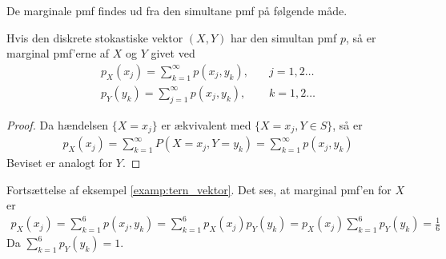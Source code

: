 De marginale pmf findes ud fra den simultane pmf på følgende måde. 
\begin{prop}\label{prop:marginalPmf} %
    Hvis den diskrete stokastiske vektor $(X,Y)$ har den simultan pmf $p$, så er marginal pmf'erne af $X$ og $Y$ givet ved
    \begin{align*}
        p_X(x_j)=\sum_{k=1}^\infty p(x_j,y_k), \quad & j=1,2\ldots
        \\
        p_Y(y_k)=\sum_{j=1}^\infty p(x_j,y_k), \quad & k=1,2\ldots
    \end{align*}
\end{prop}
\begin{proof}
Da hændelsen $\{X=x_j\}$ er ækvivalent med $\{X=x_j,Y \in S\}$, så er 
\begin{align*}
    p_X(x_j)=\sum_{k=1}^\infty P(X=x_j,Y=y_k)=\sum_{k=1}^\infty p(x_j,y_k)
\end{align*}
Beviset er analogt for $Y$. 
\end{proof}

\begin{exmp}
    Fortsættelse af  eksempel \ref{examp:tern_vektor}. Det ses, at marginal pmf'en for $X$ er 
    \begin{align*}
        p_X(x_j)=\sum_{k=1}^6 p(x_j,y_k)=\sum_{k=1}^6 p_X(x_j)p_Y(y_k) = p_X(x_j) \sum_{k=1}^6 p_Y(y_k)
        =\frac{1}{6}
    \end{align*}
    Da $\sum^6_{k = 1} p_Y(y_k) = 1$.
\end{exmp}


